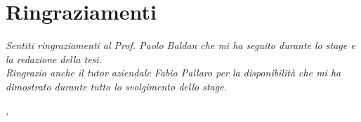 
\cleardoublepage
{}
{}

\begingroup
\let\clearpage\relax
\let\cleardoublepage\relax
\let\cleardoublepage\relax

\chapter*{Ringraziamenti}

\noindent \textit{Sentiti ringraziamenti al Prof. Paolo Baldan che mi ha seguito durante lo stage e la redazione della tesi.}\\

\noindent \textit{Ringrazio anche il tutor aziendale Fabio Pallaro per la disponibilità che mi ha dimostrato durante tutto lo svolgimento dello stage.}\\
\bigskip

\noindent\textit{\myLocation, \myTime}
\hfill \myName

\endgroup

